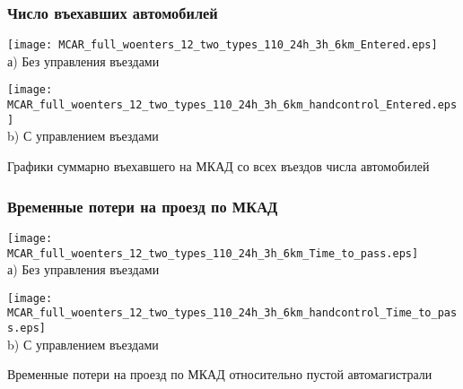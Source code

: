 \begin{frame}
    \frametitle{Число въехавших автомобилей}
    \centering
    \begin{minipage}[b]{.49\textwidth}
        \centering
        \texttt{[image: MCAR\_full\_woenters\_12\_two\_types\_110\_24h\_3h\_6km\_Entered.eps]}  \\ а) Без управления въездами
    \end{minipage}
    \hfill
    \begin{minipage}[b]{.49\textwidth}
        \centering
        \texttt{[image: MCAR\_full\_woenters\_12\_two\_types\_110\_24h\_3h\_6km\_handcontrol\_Entered.eps]}  \\ b) С управлением въездами
    \end{minipage}
    \hfill
    Графики суммарно въехавшего на МКАД со всех въездов числа автомобилей
\end{frame}


\begin{frame}
    \frametitle{Временные потери на проезд по МКАД}
    \centering
    \begin{minipage}[b]{.49\textwidth}
        \centering
        \texttt{[image: MCAR\_full\_woenters\_12\_two\_types\_110\_24h\_3h\_6km\_Time\_to\_pass.eps]}  \\ а) Без управления въездами
    \end{minipage}
    \hfill
    \begin{minipage}[b]{.49\textwidth}
        \centering
        \texttt{[image: MCAR\_full\_woenters\_12\_two\_types\_110\_24h\_3h\_6km\_handcontrol\_Time\_to\_pass.eps]}  \\ b) С управлением въездами
    \end{minipage}
    \hfill
    Временные потери на проезд по МКАД относительно пустой автомагистрали
\end{frame}


